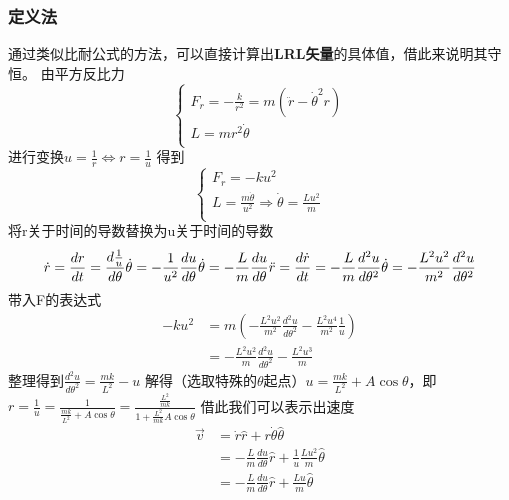 \subsubsection{定义法}
通过类似比耐公式的方法，可以直接计算出\textbf{LRL矢量}的具体值，借此来说明其守恒。
由平方反比力
\begin{equation}
\begin{cases}
F_{r}=-\frac{k}{r^{2}} = m\left(\ddot r -\dot \theta ^{2}r\right)\\
L = mr^{2}\dot \theta\\
\end{cases}
\end{equation}
进行变换$u = \frac{1}{r} \Longleftrightarrow r = \frac{1}{u}$
得到
\begin{equation}
\begin{cases}
F_{r}= -ku^{2}\\
L = \frac{m\dot \theta}{u^{2}}\Rightarrow \dot \theta = \frac{Lu^2}{m}\\
\end{cases}
\end{equation}
将r关于时间的导数替换为u关于时间的导数
\begin{equation}
\dot r = \frac{dr}{dt}= \frac{d \frac{1}{u}}{d\theta}\dot \theta =-\frac{1}{u^{2} } \frac{du}{d\theta} \dot \theta = -\frac{L}{m}\frac{du}{d\theta}\\
\ddot r = \frac{d \dot r}{d t} =-\frac{L}{m} \frac{d^{2}u}{d \theta^{2}} \dot \theta = -\frac{L^{2}u^{2}}{m^{2}}\frac{d^{2}u}{d \theta^{2}}\\
\end{equation}
带入F的表达式
\begin{align}
-ku^{2}
&=m\left(-\frac{L^{2}u^{2}}{m^{2}}\frac{d^{2}u}{d \theta^{2}}-\frac{L^{2}u^{4}}{m^{2}}\frac{1}{u}\right) \\
&= -\frac{L^{2}u^{2}}{m}\frac{d^{2}u}{d \theta^{2}}-\frac{L^{2}u^{3}}{m}\
\end{align}
整理得到$\frac{d^{2}u}{d\theta^{2}} = \frac{mk}{L^{2}}-u$
解得（选取特殊的$\theta$起点）$u = \frac{mk}{L^{2}} + A \cos \theta$，即$r = \frac{1}{u} = \frac{1}{\frac{mk}{L^{2}} + A \cos \theta} = \frac{\frac{L^2}{mk}}{1 + \frac{L^2}{mk} A \cos \theta}$
借此我们可以表示出速度
\begin{align}
\vec v &= \dot r \hat r + r \dot \theta \hat \theta \\
&=-\frac{L}{m}\frac{du}{d\theta} \hat r + \frac{1}{u} \frac{Lu^{2}}{m} \hat \theta\\
&=-\frac{L}{m}\frac{du}{d\theta} \hat r +  \frac{Lu}{m} \hat \theta
\end{align}
